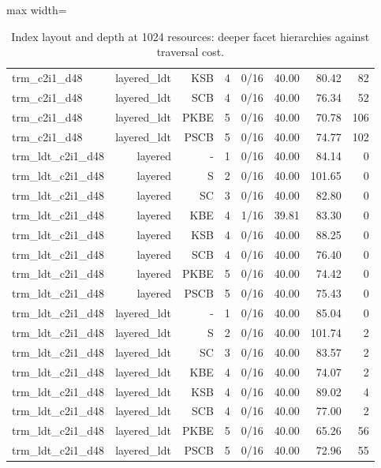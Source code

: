 \begin{table}[t]
\begin{adjustbox}{max width=\linewidth}
\begin{tabular}{lrrrrrrr}
trm\_c2i1\_d48 & layered\_ldt & KSB & 4 & 0/16 & 40.00 & 80.42 & 82 \\
trm\_c2i1\_d48 & layered\_ldt & SCB & 4 & 0/16 & 40.00 & 76.34 & 52 \\
trm\_c2i1\_d48 & layered\_ldt & PKBE & 5 & 0/16 & 40.00 & 70.78 & 106 \\
trm\_c2i1\_d48 & layered\_ldt & PSCB & 5 & 0/16 & 40.00 & 74.77 & 102 \\
trm\_ldt\_c2i1\_d48 & layered & - & 1 & 0/16 & 40.00 & 84.14 & 0 \\
trm\_ldt\_c2i1\_d48 & layered & S & 2 & 0/16 & 40.00 & 101.65 & 0 \\
trm\_ldt\_c2i1\_d48 & layered & SC & 3 & 0/16 & 40.00 & 82.80 & 0 \\
trm\_ldt\_c2i1\_d48 & layered & KBE & 4 & 1/16 & 39.81 & 83.30 & 0 \\
trm\_ldt\_c2i1\_d48 & layered & KSB & 4 & 0/16 & 40.00 & 88.25 & 0 \\
trm\_ldt\_c2i1\_d48 & layered & SCB & 4 & 0/16 & 40.00 & 76.40 & 0 \\
trm\_ldt\_c2i1\_d48 & layered & PKBE & 5 & 0/16 & 40.00 & 74.42 & 0 \\
trm\_ldt\_c2i1\_d48 & layered & PSCB & 5 & 0/16 & 40.00 & 75.43 & 0 \\
trm\_ldt\_c2i1\_d48 & layered\_ldt & - & 1 & 0/16 & 40.00 & 85.04 & 0 \\
trm\_ldt\_c2i1\_d48 & layered\_ldt & S & 2 & 0/16 & 40.00 & 101.74 & 2 \\
trm\_ldt\_c2i1\_d48 & layered\_ldt & SC & 3 & 0/16 & 40.00 & 83.57 & 2 \\
trm\_ldt\_c2i1\_d48 & layered\_ldt & KBE & 4 & 0/16 & 40.00 & 74.07 & 2 \\
trm\_ldt\_c2i1\_d48 & layered\_ldt & KSB & 4 & 0/16 & 40.00 & 89.02 & 4 \\
trm\_ldt\_c2i1\_d48 & layered\_ldt & SCB & 4 & 0/16 & 40.00 & 77.00 & 2 \\
trm\_ldt\_c2i1\_d48 & layered\_ldt & PKBE & 5 & 0/16 & 40.00 & 65.26 & 56 \\
trm\_ldt\_c2i1\_d48 & layered\_ldt & PSCB & 5 & 0/16 & 40.00 & 72.96 & 55 \\
\bottomrule
\end{tabular}
\end{adjustbox}
\caption{Index layout and depth at 1024 resources: deeper facet hierarchies against traversal cost.}
\label{tab:mcp02-pilot_cpu-layout}
\end{table}
